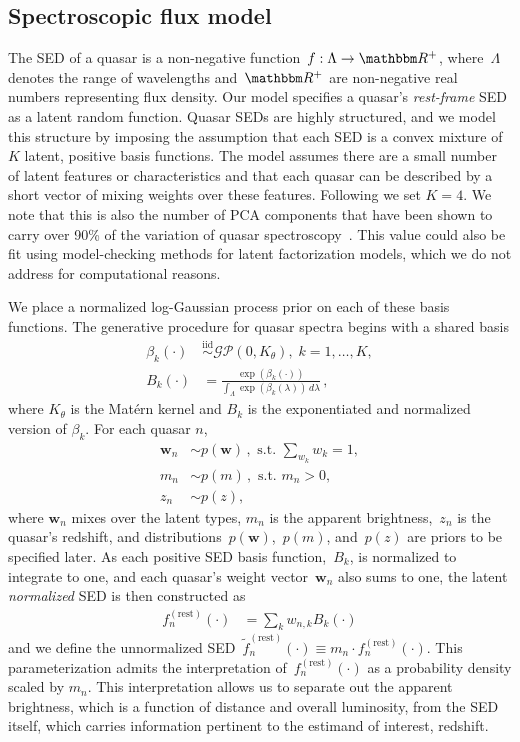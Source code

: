 \documentclass{article} %
\begin{document}
\subsection{Spectroscopic flux model}
The SED of a quasar is a non-negative function~${f : \Lambda \rightarrow \R^+}$, where~$\Lambda$ denotes the range of wavelengths and~$\R^+$ are non-negative real numbers representing flux density.
Our model specifies a quasar's \emph{rest-frame} SED as a latent random function. 
Quasar SEDs are highly structured, and we model this structure by imposing the assumption that each SED is a convex mixture of~$K$ latent, positive basis functions. 
The model assumes there are a small number of latent features or characteristics and that each quasar can be described by a short vector of mixing weights over these features.  
Following \cite{budavari2001photometric} we set ${K = 4}$. 
We note that this is also the number of PCA components that have been shown to carry over 90\% of the variation of quasar spectroscopy~\cite{suzuki2006quasar}.  
This value could also be fit using model-checking methods for latent factorization models, which we do not address for computational reasons.

We place a normalized log-Gaussian process prior on each of these basis functions.  
The generative procedure for quasar spectra begins with a shared basis
\begin{align}
  \beta_k(\cdot) &\stackrel{\text{iid}}{\sim} \mathcal{GP}(0, K_\theta),\; k=1, \dots, K,\\
  B_k(\cdot) &= \frac{\exp(\beta_k(\cdot))}{\int_\Lambda \exp(\beta_k(\lambda))\, d\lambda}   \, ,
\end{align}
where $K_{\theta}$ is the Mat\'{e}rn kernel and $B_k$ is the exponentiated and normalized version of $\beta_k$. For each quasar $n$,
\begin{align}
  \mathbf{w}_n &\sim p(\mathbf{w}) \, , \text{ s.t. } \sum_{w_k} w_k = 1, \\
  m_n  &\sim p(m) \, , \text{ s.t. } m_n > 0, \\
  z_n &\sim p(z),
\end{align}
where $\mathbf{w}_n$ mixes over the latent types, $m_n$ is the apparent brightness,~$z_n$ is the quasar's redshift, and distributions~$p(\mathbf{w})$,~$p(m)$, and~$p(z)$ are priors to be specified later.
As each positive SED basis function,~$B_k$, is normalized to integrate to one, and each quasar's weight vector~$\mathbf{w}_n$ also sums to one, the latent \emph{normalized} SED is then constructed as
\begin{align}
  f^{(\text{rest})}_n(\cdot) &= \sum_{k} w_{n,k} B_k(\cdot)
  \label{eqn:restsed}
\end{align}
and we define the unnormalized SED~${\tilde f^{(\text{rest})}_n(\cdot) \equiv m_n \cdot f^{(\text{rest})}_n(\cdot)}$. 
This parameterization admits the interpretation of~$f^{(\text{rest})}_n(\cdot)$ as a probability density scaled by $m_n$.  
This interpretation allows us to separate out the apparent brightness, which is a function of distance and overall luminosity, from the SED itself, which carries information pertinent to the estimand of interest, redshift. 
\end{document}
